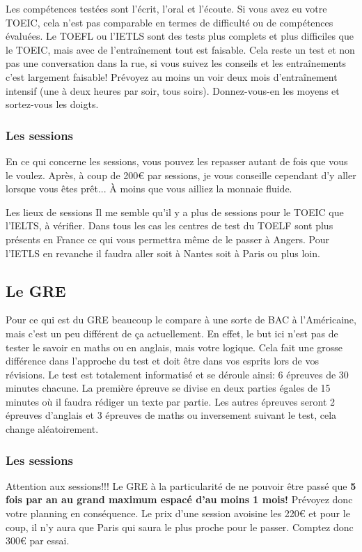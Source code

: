 Les compétences testées sont l’écrit, l’oral et l’écoute. Si vous avez eu votre TOEIC, cela n’est pas comparable en termes de difficulté ou de compétences évaluées. Le TOEFL ou l’IETLS sont des tests plus complets et plus difficiles que le TOEIC, mais avec de l’entraînement tout est faisable. Cela reste un test et non pas une conversation dans la rue, si vous suivez les conseils et les entraînements c’est largement faisable! Prévoyez au moins un voir deux mois d’entraînement intensif (une à deux heures par soir, tous soirs). Donnez-vous-en les moyens et sortez-vous les doigts.

\subsubsection{Les sessions}\label{sec:sec2.2.1.1}
En ce qui concerne les sessions, vous pouvez les repasser autant de fois que vous le voulez. Après, à coup de 200\euro{} par sessions, je vous conseille cependant d’y aller lorsque vous êtes prêt... À moins que vous ailliez la monnaie fluide.

\begin{example}{Les lieux de sessions}
  Il me semble qu’il y a plus de sessions pour le TOEIC que l’IELTS, à vérifier.
  Dans tous les cas les centres de test du TOELF sont plus présents en France ce qui vous permettra même de le passer à Angers. Pour l’IETLS en revanche il faudra aller soit à Nantes soit à Paris ou plus loin.
\end{example}

\subsection{Le GRE}\label{sec:sec2.2.2}
Pour ce qui est du GRE beaucoup le compare à une sorte de BAC à l’Américaine, mais c’est un peu différent de ça actuellement. En effet, le but ici n’est pas de tester le savoir en maths ou en anglais, mais votre logique. Cela fait une grosse différence dans l’approche du test et doit être dans vos esprits lors de vos révisions. Le test est totalement informatisé et se déroule ainsi: 6 épreuves de 30 minutes chacune. La première épreuve se divise en deux parties égales de 15 minutes où il faudra rédiger un texte par partie. Les autres épreuves seront 2 épreuves d’anglais et 3 épreuves de maths ou inversement suivant le test, cela change aléatoirement.

\subsubsection{Les sessions}\label{sec:sec2.2.2.1}
Attention aux sessions!!! Le GRE à la particularité de ne pouvoir être passé que \textbf{5 fois par an au grand maximum espacé d’au moins 1 mois!} Prévoyez donc votre planning en conséquence. Le prix d’une session avoisine les 220\euro{} et pour le coup, il n’y aura que Paris qui saura le plus proche pour le passer. Comptez donc 300\euro{} par essai.

